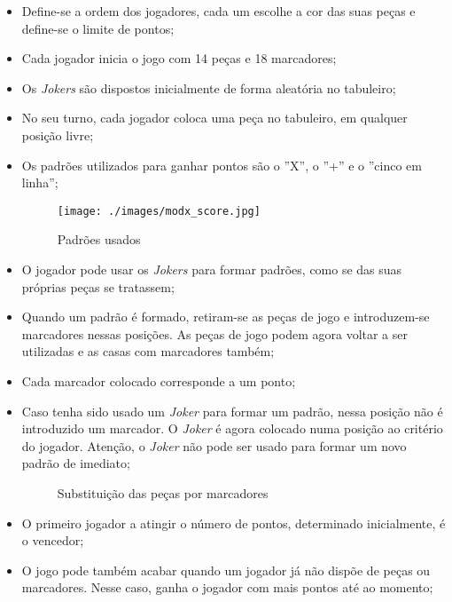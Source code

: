 \documentclass[a4paper]{article}
\begin{document}
\begin{itemize}
	\item Define-se a ordem dos jogadores, cada um escolhe a cor das suas peças e define-se o limite de pontos;
	\item Cada jogador inicia o jogo com 14 peças e 18 marcadores;
	\item Os \textit{Jokers} são dispostos inicialmente de forma aleatória no tabuleiro; 
	\item No seu turno, cada jogador coloca uma peça no tabuleiro, em qualquer posição livre;
	\item Os padrões utilizados para ganhar pontos são o ''X'', o ''+'' e o ''cinco em linha'';
	
	\begin{figure}[h!]
		\begin{center}
			\texttt{[image: ./images/modx\_score.jpg]}
			\caption{Padrões usados}
			\label{fig:2}
		\end{center}
	\end{figure}
	
	\item O jogador pode usar os \textit{Jokers} para formar padrões, como se das suas próprias peças se tratassem;
	\item Quando um padrão é formado, retiram-se as peças de jogo e introduzem-se marcadores nessas posições. As peças de jogo podem agora voltar a ser utilizadas e as casas com marcadores também;
	\item Cada marcador colocado corresponde a um ponto;
	\item Caso tenha sido usado um \textit{Joker} para formar um padrão, nessa posição não é introduzido um marcador. O \textit{Joker} é agora colocado numa posição ao critério do jogador. Atenção, o \textit{Joker} não pode ser usado para formar um novo padrão de imediato; 
	
	\begin{figure}[!h]
		\centering
		\hfill
		\caption{Substituição das peças por marcadores}
	\end{figure}
	
	\item O primeiro jogador a atingir o número de pontos, determinado inicialmente, é o vencedor;
	\item O jogo pode também acabar quando um jogador já não dispõe de peças ou marcadores. Nesse caso, ganha o jogador com mais pontos até ao momento;
	

	
\end{itemize}
\end{document}
